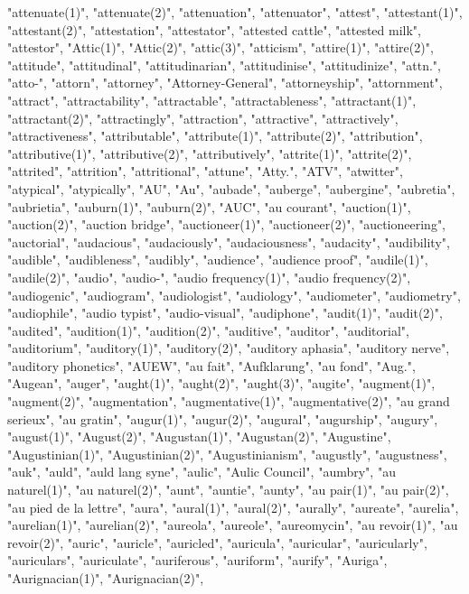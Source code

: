 "attenuate(1)",
"attenuate(2)",
"attenuation",
"attenuator",
"attest",
"attestant(1)",
"attestant(2)",
"attestation",
"attestator",
"attested cattle",
"attested milk",
"attestor",
"Attic(1)",
"Attic(2)",
"attic(3)",
"atticism",
"attire(1)",
"attire(2)",
"attitude",
"attitudinal",
"attitudinarian",
"attitudinise",
"attitudinize",
"attn.",
"atto-",
"attorn",
"attorney",
"Attorney-General",
"attorneyship",
"attornment",
"attract",
"attractability",
"attractable",
"attractableness",
"attractant(1)",
"attractant(2)",
"attractingly",
"attraction",
"attractive",
"attractively",
"attractiveness",
"attributable",
"attribute(1)",
"attribute(2)",
"attribution",
"attributive(1)",
"attributive(2)",
"attributively",
"attrite(1)",
"attrite(2)",
"attrited",
"attrition",
"attritional",
"attune",
"Atty.",
"ATV",
"atwitter",
"atypical",
"atypically",
"AU",
"Au",
"aubade",
"auberge",
"aubergine",
"aubretia",
"aubrietia",
"auburn(1)",
"auburn(2)",
"AUC",
"au courant",
"auction(1)",
"auction(2)",
"auction bridge",
"auctioneer(1)",
"auctioneer(2)",
"auctioneering",
"auctorial",
"audacious",
"audaciously",
"audaciousness",
"audacity",
"audibility",
"audible",
"audibleness",
"audibly",
"audience",
"audience proof",
"audile(1)",
"audile(2)",
"audio",
"audio-",
"audio frequency(1)",
"audio frequency(2)",
"audiogenic",
"audiogram",
"audiologist",
"audiology",
"audiometer",
"audiometry",
"audiophile",
"audio typist",
"audio-visual",
"audiphone",
"audit(1)",
"audit(2)",
"audited",
"audition(1)",
"audition(2)",
"auditive",
"auditor",
"auditorial",
"auditorium",
"auditory(1)",
"auditory(2)",
"auditory aphasia",
"auditory nerve",
"auditory phonetics",
"AUEW",
"au fait",
"Aufklarung",
"au fond",
"Aug.",
"Augean",
"auger",
"aught(1)",
"aught(2)",
"aught(3)",
"augite",
"augment(1)",
"augment(2)",
"augmentation",
"augmentative(1)",
"augmentative(2)",
"au grand serieux",
"au gratin",
"augur(1)",
"augur(2)",
"augural",
"augurship",
"augury",
"august(1)",
"August(2)",
"Augustan(1)",
"Augustan(2)",
"Augustine",
"Augustinian(1)",
"Augustinian(2)",
"Augustinianism",
"augustly",
"augustness",
"auk",
"auld",
"auld lang syne",
"aulic",
"Aulic Council",
"aumbry",
"au naturel(1)",
"au naturel(2)",
"aunt",
"auntie",
"aunty",
"au pair(1)",
"au pair(2)",
"au pied de la lettre",
"aura",
"aural(1)",
"aural(2)",
"aurally",
"aureate",
"aurelia",
"aurelian(1)",
"aurelian(2)",
"aureola",
"aureole",
"aureomycin",
"au revoir(1)",
"au revoir(2)",
"auric",
"auricle",
"auricled",
"auricula",
"auricular",
"auricularly",
"auriculars",
"auriculate",
"auriferous",
"auriform",
"aurify",
"Auriga",
"Aurignacian(1)",
"Aurignacian(2)",
